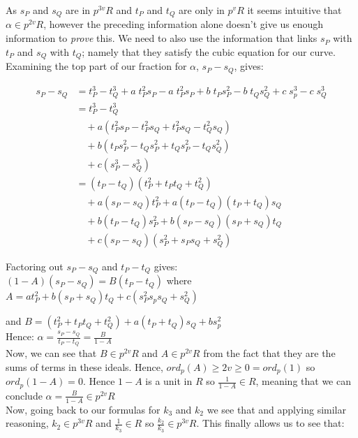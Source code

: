 \documentclass{article}
\begin{document}
As $s_P$ and $s_Q$ are in $p^{3v}R$ and $t_P$ and $t_Q$ are only in $p^v R$ it seems intuitive that $\alpha \in p^{2v}R$, however the preceding information alone doesn't give us enough information to \emph{prove} this. We need to also use the information that links $s_P$ with $t_P$ and $s_Q$ with $t_Q$; namely that they satisfy the cubic equation for our curve. Examining the top part of our fraction for $\alpha$, $s_P - s_Q$, gives:

\begin{align*} 
s_P - s_Q &= t_P^3 - t_Q^3 + a \; t_P^2 s_P - a \; t_P^2 s_P + b \; t_P s_P^2 - b \; t_Q s_Q^2 + c \; s_p^3 - c \; s_Q^3 \\
&= t_P^3 - t_Q^3 \\
& \quad + a(t_P^2 s_P - t_P^2 s_Q + t_P^2 s_Q - t_Q^2 s_Q) \\
& \quad + b(t_P s_P^2 - t_Q s_P^2 + t_Q s_P^2 - t_Q s_Q^2) \\
& \quad + c(s_P^3 - s_Q^3) \\
&= (t_P - t_Q)(t_P^2 + t_P t_Q + t_Q^2) \\
& \quad + a(s_P - s_Q)t_P^2 + a(t_P - t_Q)(t_P + t_Q)s_Q \\
& \quad + b(t_P - t_Q)s_P^2 + b(s_P - s_Q)(s_P + s_Q)t_Q \\
& \quad + c(s_P - s_Q)(s_P^2 + s_P s_Q + s_Q ^2)
\end{align*} 


Factoring out $s_P - s_Q$ and $t_P - t_Q$ gives:\\

$(1 - A)(s_P - s_Q) = B(t_P - t_Q)$ where $A = a t_P^2 + b(s_P + s_Q)t_Q + c(s_P ^2 s_p s_Q + s_Q^2)$ 

and $B = (t_P^2 + t_P t_Q + t_Q^2) + a (t_P + t_Q)s_Q + b s_p^2$\\

Hence: $\alpha = \frac{s_P - s_Q}{t_P - t_Q} = \frac{B}{1 - A}$\\

Now, we can see that $B \in p^{2v}R$ and $A \in p^{2v} R$ from the fact that they are the sums of terms in these ideals. Hence, $ord_p(A) \geq 2v \geq 0 = ord_p(1)$ so $ord_p(1 - A) = 0$. Hence $1 - A$ is a unit in $R$ so $\frac{1}{1 - A} \in R$, meaning that we can conclude $\alpha = \frac{B}{1 - A} \in p^{2v}R$ \\

Now, going back to our formulas for $k_3$ and $k_2$ we see that and applying similar reasoning, $k_2 \in p^{3v}R$ and $\frac{1}{k_3} \in R$ so $\frac{k_2}{k_3} \in p^{3v}R$. This finally allows us to see that:\\
\end{document}

